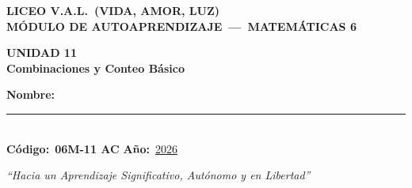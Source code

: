 \documentclass[12pt, letterpaper]{article}
\begin{document}
	
	\begin{center}
		{\Large\bfseries\color{valblue} LICEO V.A.L.\ (VIDA, AMOR, LUZ)}\\[4pt]
		{\large\bfseries MÓDULO DE AUTOAPRENDIZAJE\ ---\ MATEMÁTICAS 6\textdegree}\\[8pt]
		
		\begin{tcolorbox}[
			enhanced, arc=6mm, boxrule=2pt,
			colback=valblue, colframe=valdark,
			halign=center,
			]
			{\Huge\bfseries\color{white} UNIDAD 11}\\[4pt]
			{\Large\bfseries\color{yellow!90!white}
				Combinaciones y Conteo Básico}
		\end{tcolorbox}
		
		\vspace{6pt}
		
		\begin{tcolorbox}[
			enhanced, arc=4mm, boxrule=1.5pt,
			colback=white, colframe=valblue,
			width=0.88\linewidth, halign=center,
			]
			{\bfseries Nombre:}			\rule{9cm}{0.5pt}\\[6pt]
			{\bfseries Código:}\ \textbf{06M-11 AC}
			\hspace{2cm}
			{\bfseries Año:}\ \underline{2026}
		\end{tcolorbox}
		
		\vspace{4pt}
		{\itshape ``Hacia un Aprendizaje Significativo, Autónomo y en Libertad''}
	\end{center}
	
\end{document}
